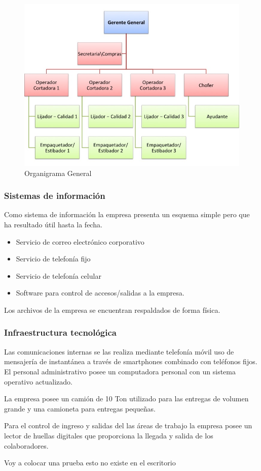 \documentclass[12pt, a4paper]{article}
\begin{document}
\begin{figure}[H]
 \centering
 \includegraphics[width=1\textwidth]{Organigrama.jpg}
 \captionsetup{justification=centering} %
 \caption{Organigrama General}
 \label{figura:4}
\end{figure}

\subsubsection {Sistemas de información}
Como sistema de información la empresa presenta un esquema simple pero que ha resultado útil hasta la fecha.

\begin{itemize}	
		\item Servicio de correo electrónico corporativo
		\item Servicio de telefonía fijo
		\item Servicio de telefonía celular
		\item Software para control de accesos/salidas a la empresa.
	\end{itemize}
Los archivos de la empresa se encuentran respaldados de forma física.

\subsubsection{Infraestructura tecnológica}
Las comunicaciones internas se las realiza mediante telefonía móvil uso de mensajería de instantánea a través de smartphones combinado con teléfonos fijos. El personal administrativo posee un computadora personal con un sistema operativo actualizado.

La empresa posee un camión de 10 Ton utilizado para las entregas de volumen grande y una camioneta para entregas pequeñas. 

Para el control de ingreso y salidas del las áreas de trabajo la empresa posee un lector de huellas digitales que proporciona la llegada y salida de los colaboradores.

Voy a colocar una prueba esto no existe en el escritorio
\end{document}
